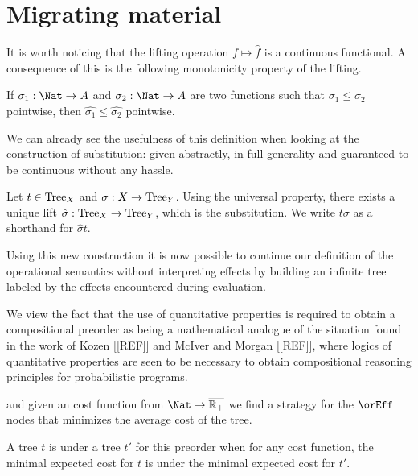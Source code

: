 \section{Migrating material}

It is worth noticing that the lifting operation $f \mapsto \hat{f}$ is
a continuous functional. A consequence of this is the following monotonicity 
property of the lifting.

\begin{alemma}
    \label{lem:orderpreservinglift}
    If $\sigma_1 : \Nat \to A$ and $\sigma_2 : \Nat \to A$ 
    are two functions such that $\sigma_1 \leq \sigma_2$ pointwise,
    then $\hat{\sigma_1} \leq \hat{\sigma_2}$ pointwise.
\end{alemma}

We can already see the usefulness of this definition 
when looking at the construction of substitution:
given abstractly, in full generality and 
guaranteed to be continuous without any hassle. 

\begin{adefinition}[Substitution]
    Let $t \in \textnormal{Tree}_X$ 
    and $\sigma : X \to \textnormal{Tree}_Y$.
    Using the universal property, there exists a
    unique lift $\hat{\sigma} : \textnormal{Tree}_X \to \textnormal{Tree}_Y$,
    which is the substitution. We write $t\sigma$ as a shorthand for 
    $\hat{\sigma}t$.
\end{adefinition}


Using this new construction it is now possible  
to continue our definition of the operational semantics without 
interpreting effects by building an infinite tree
labeled by the effects encountered during evaluation.



% 

We view the fact that the use of quantitative properties is required to obtain a compositional preorder as being
a mathematical analogue of the situation found in the work of Kozen [[REF]] and McIver and Morgan [[REF]], where 
logics of quantitative properties are seen to be necessary to obtain compositional reasoning principles for 
probabilistic programs.

and given an cost function from $\Nat \to \overline{\mathbb{R}_+}$
we find a strategy for the $\orEff$ nodes that minimizes the average
cost of the tree. 

A tree $t$ is under a tree $t'$ for this preorder when for any 
cost function, the minimal expected cost for $t$ is under the 
minimal expected cost for $t'$.


